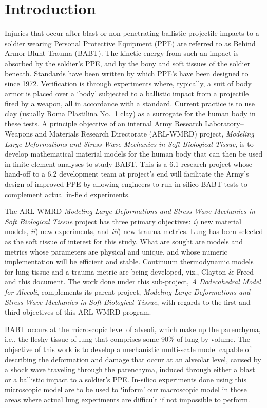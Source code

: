 \part{Introduction}
\label{partIntroduction}

Injuries that occur after blast or non-penetrating ballistic projectile impacts to a soldier wearing Personal Protective Equipment (PPE) are referred to as Behind Armor Blunt Trauma (BABT).  The kinetic energy from such an impact is absorbed by the soldier's PPE, and by the bony and soft tissues of the soldier beneath.  Standards have been written by which PPE's have been designed to since 1972.  Verification is through experiments where, typically, a suit of body armor is placed over a `body' subjected to a ballistic impact from a projectile fired by a weapon, all in accordance with a standard.  Current practice is to use clay (usually Roma Plastilina No.~1 clay) as a surrogate for the human body in these tests.  A principle objective of an internal Army Research Laboratory--Weapons and Materials Research Directorate (ARL-WMRD) project, \textit{Modeling Large Deformations and Stress Wave Mechanics in Soft Biological Tissue}, is to develop mathematical material models for the human body that can then be used in finite element analyses to study BABT.  This is a 6.1 research project whose hand-off to a 6.2 development team at project's end will facilitate the Army's design of improved PPE by allowing engineers to run in-silico BABT tests to complement actual in-field experiments.

The ARL-WMRD \textit{Modeling Large Deformations and Stress Wave Mechanics in Soft Biological Tissue\/} project has three primary objectives: \textit{i\/}) new material models, \textit{ii\/}) new experiments, and \textit{iii\/}) new trauma metrics.  Lung has been selected as the soft tissue of interest for this study.  What are sought are models and metrics whose parameters are physical and unique, and whose numeric implementation will be efficient and stable.  Continuum thermo\-dynamic models for lung tissue and a trauma metric are being developed, viz., Clayton \& Freed \cite{ClaytonFreed19} and this document.  The work done under this sub-project, \textit{A Dodecahedral Model for Alveoli}, complements its parent project, \textit{Modeling Large Deformations and Stress Wave Mechanics in Soft Biological Tissue}, with regards to the first and third objectives of this ARL-WMRD program. 

BABT occurs at the microscopic level of alveoli, which make up the parenchyma, i.e., the fleshy tissue of lung that comprises some 90\% of lung by volume.  The objective of this work is to develop a mechanistic multi-scale model capable of describing the deformation and damage that occur at an alveolar level, caused by a shock wave traveling through the parenchyma, induced through either a blast or a ballistic impact to a soldier's PPE.  In-silico experiments done using this microscopic model are to be used to `inform' our macroscopic model in those areas where actual lung experiments are difficult if not impossible to perform.

